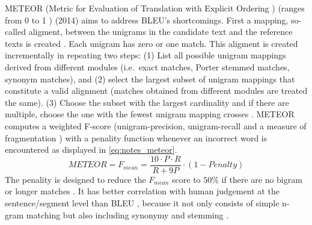 METEOR (Metric for Evaluation of Translation with Explicit Ordering \citep{palivela_optimization_2021,banerjee_METEOR_2005}) 
(ranges from 0 to 1 \citep{kurt_pehlivanoglu_comparative_2024}) (2014) aims to address BLEU's shortcomings.
First a mapping, so-called aligment, between the unigrams in the candidate text and the reference texts is created \citep{banerjee_METEOR_2005}.
Each unigram has zero or one match.
This aligment is created incrementally in repeating two steps:
(1) List all possible unigram mappings derived from different modules (i.e.\ exact matches, Porter stemmed matches, synonym matches), 
and (2) select the largest subset of unigram mappings that constitute a valid alignment (matches obtained from different modules are treated the same).
(3) Choose the subset with the largest cardinality and if there are multiple, choose the one with the fewest unigram mapping crosses \citep{banerjee_METEOR_2005}.
METEOR computes a weighted F-score 
(unigram-precision, unigram-recall \citep{kurt_pehlivanoglu_comparative_2024,banerjee_METEOR_2005} 
and a measure of fragmentation \citep{banerjee_METEOR_2005,kurt_pehlivanoglu_comparative_2024})
with a penality function whenever an incorrect word is encountered \citep{palivela_optimization_2021} as displayed in \autoref{eq:notes_meteor}.
\begin{equation}
    METEOR = F_{mean} = \frac{10 \cdot P \cdot R}{R + 9P} \cdot (1 - Penalty)
\label{eq:notes_meteor}
\end{equation}
The penality is designed to reduce the $F_{mean}$ score to $50\%$ if there are no bigram or longer matches \citep{banerjee_METEOR_2005}.
It has better correlation with human judgement at the sentence/segment level than BLEU \citep{zhou_paraphrase_2021}, 
because it not only consists of simple n-gram matching but also including synonymy and stemming \citep{kurt_pehlivanoglu_comparative_2024}.

